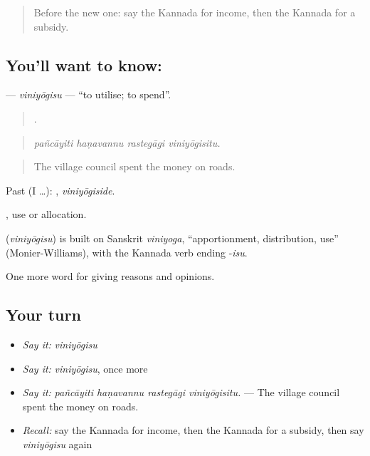 \label{lesson:KA-C400-viniyogisu}



\begin{quote}
Before the new one: say the Kannada for income, then the Kannada for a subsidy.
\end{quote}

\subsection*{You'll want to know: }
\textbf{} — \emph{viniyōgisu} — \textquotedblleft{}to utilise; to spend\textquotedblright{}.

\begin{quote}
   .
\end{quote}

\begin{quote}
\emph{pañcāyiti haṇavannu rastegāgi viniyōgisitu.}
\end{quote}

\begin{quote}
The village council spent the money on roads.
\end{quote}

Past (I …): , \emph{viniyōgiside}.

, use or allocation.

\begin{cousinweb}
\textbf{} (\emph{viniyōgisu}) is built on Sanskrit \emph{viniyoga}, \textquotedblleft{}apportionment, distribution, use\textquotedblright{} (Monier-Williams), with the Kannada verb ending -\emph{isu}.
\end{cousinweb}

\begin{grammarlens}[title={What you've built}]
One more word for giving reasons and opinions.
\end{grammarlens}

\subsection*{Your turn}
\begin{itemize}
\raggedright
  \item \emph{Say it:} \emph{viniyōgisu}
  \item \emph{Say it:} \emph{viniyōgisu}, once more
  \item \emph{Say it:} \emph{pañcāyiti haṇavannu rastegāgi viniyōgisitu.} — The village council spent the money on roads.
  \item \emph{Recall:} say the Kannada for income, then the Kannada for a subsidy, then say \emph{viniyōgisu} again
\end{itemize}

